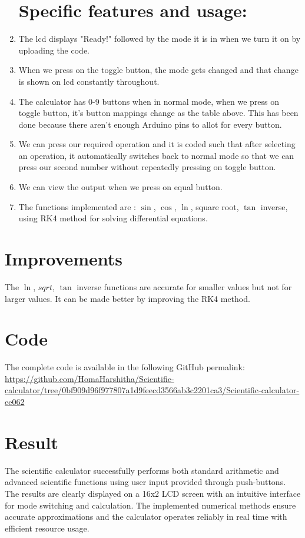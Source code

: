 \documentclass[journal]{IEEEtran}
\begin{document}
\begin{enumerate}
\section{Specific features and usage:}
\item The lcd displays "Ready!" followed by the mode it is in when we turn it on by uploading the code.
\item When we press on the toggle button, the mode gets changed and that change is shown on lcd constantly throughout.
\item The calculator has 0-9 buttons when in normal mode, when we press on toggle button, it's button mappings change as the table above. This has been done because there aren't enough Arduino pins to allot for every button.
\item We can press our required operation and it is coded such that after selecting an operation, it automatically switches back to normal mode so that we can press our second number without repeatedly pressing on toggle button.
\item We can view the output when we press on equal button.
\item The functions implemented are : $\sin$, $\cos$, $\ln$, square root, $\tan$ inverse, using RK4 method for solving differential equations.
\end{enumerate}
\section{Improvements}
The $\ln$, $sqrt$, $\tan$ inverse functions are accurate for smaller values but not for larger values. It can be made better by improving the RK4 method.
\section{Code}
The complete code is available in the following GitHub permalink: \\
\url{https://github.com/HomaHarshitha/Scientific-calculator/tree/0bf909d96f977807a1d9feecd3566ab3c2201ca3/Scientific-calculator-ee062}

\section{Result}
The scientific calculator successfully performs both standard arithmetic and advanced scientific functions using user input provided through push-buttons. The results are clearly displayed on a 16x2 LCD screen with an intuitive interface for mode switching and calculation. The implemented numerical methods ensure accurate approximations and the calculator operates reliably in real time with efficient resource usage.
\end{document}
